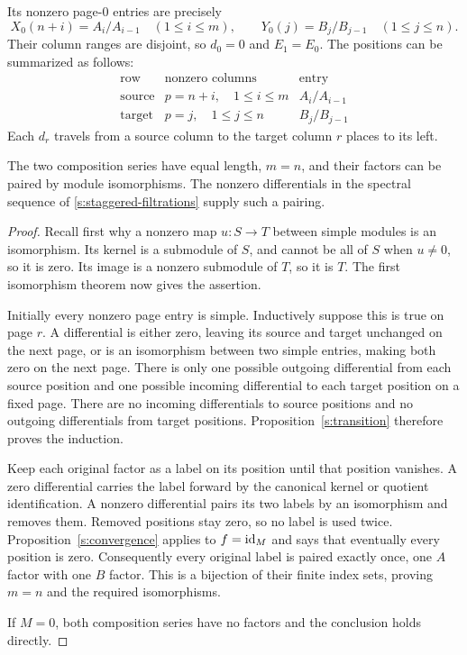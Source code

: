 Its nonzero page-$0$ entries are precisely
\[
X_0(n+i)=A_i/A_{i-1}\quad(1\leq i\leq m),
\qquad
Y_0(j)=B_j/B_{j-1}\quad(1\leq j\leq n).
\]
Their column ranges are disjoint, so $d_0=0$ and $E_1=E_0$.
The positions can be summarized as follows:
\[
\begin{array}{c|c|c}
\text{row}&\text{nonzero columns}&\text{entry}\\ \hline
\text{source}&p=n+i,\quad1\leq i\leq m&A_i/A_{i-1}\\
\text{target}&p=j,\quad1\leq j\leq n&B_j/B_{j-1}
\end{array}
\]
Each $d_r$ travels from a source column to the target column $r$ places
to its left.

\begin{theorem}
\label{s:jordan-holder}
The two composition series have equal length, $m=n$, and their factors
can be paired by module isomorphisms. The nonzero differentials in the
spectral sequence of \eqref{s:staggered-filtrations} supply such a pairing.
\end{theorem}

\begin{proof}
Recall first why a nonzero map $u:S\to T$ between simple modules is an
isomorphism. Its kernel is a submodule of $S$, and cannot be all of $S$
when $u\neq0$, so it is zero. Its image is a nonzero submodule of $T$,
so it is $T$. The first isomorphism theorem now gives the assertion.

Initially every nonzero page entry is simple. Inductively suppose this
is true on page $r$. A differential is either zero, leaving its source
and target unchanged on the next page, or is an isomorphism between two
simple entries, making both zero on the next page. There is only one
possible outgoing differential from each source position and one
possible incoming differential to each target position on a fixed page.
There are no incoming differentials to source positions and no outgoing
differentials from target positions. Proposition~\ref{s:transition}
therefore proves the induction.

Keep each original factor as a label on its position until that position
vanishes. A zero differential carries the label forward by the canonical
kernel or quotient identification. A nonzero differential pairs its two
labels by an isomorphism and removes them. Removed positions stay zero,
so no label is used twice. Proposition~\ref{s:convergence} applies to
$f=\mathrm{id}_M$ and says that eventually every position is zero. Consequently
every original label is paired exactly once, one $A$ factor with one
$B$ factor. This is a bijection of their finite index sets, proving
$m=n$ and the required isomorphisms.

If $M=0$, both composition series have no factors and the conclusion
holds directly.
\end{proof}

